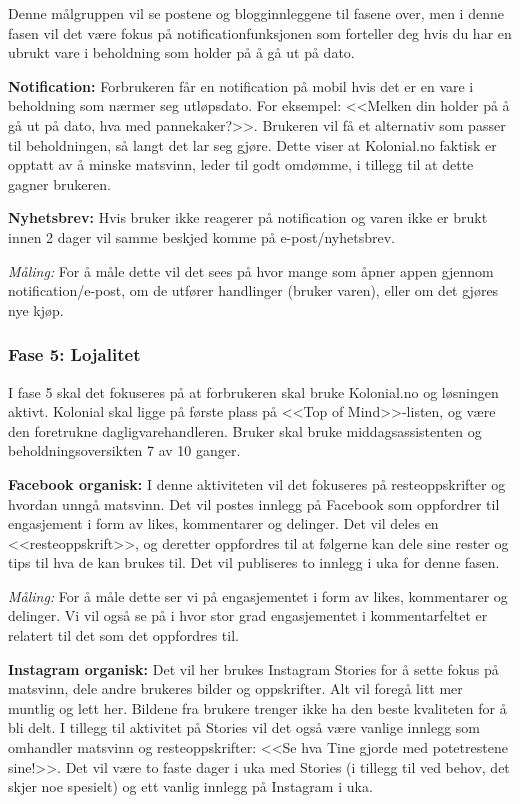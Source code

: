 Denne målgruppen vil se postene og blogginnleggene til fasene over, men i denne fasen vil det være fokus på notificationfunksjonen som forteller deg hvis du har en ubrukt vare i beholdning som holder på å gå ut på dato. 

\textbf{Notification:} Forbrukeren får en notification på mobil hvis det er en vare i beholdning som nærmer seg utløpsdato. For eksempel: <<Melken din holder på å gå ut på dato, hva med pannekaker?>>. Brukeren vil få et alternativ som passer til beholdningen, så langt det lar seg gjøre. Dette viser at Kolonial.no faktisk er opptatt av å minske matsvinn, leder til godt omdømme, i tillegg til at dette gagner brukeren. 

\textbf{Nyhetsbrev:} Hvis bruker ikke reagerer på notification og varen ikke er brukt innen 2 dager vil samme beskjed komme på e-post/nyhetsbrev. 

\textit{Måling:} For å måle dette vil det sees på hvor mange som åpner appen gjennom notification/e-post, om de utfører handlinger (bruker varen), eller om det gjøres nye kjøp. 

\subsubsection{\textbf{Fase 5: Lojalitet}}
I fase 5 skal det fokuseres på at forbrukeren skal bruke Kolonial.no og løsningen aktivt. Kolonial skal ligge på første plass på <<Top of Mind>>-listen, og være den foretrukne dagligvarehandleren. Bruker skal bruke middagsassistenten og beholdningsoversikten 7 av 10 ganger. 

\textbf{Facebook organisk:} I denne aktiviteten vil det fokuseres på resteoppskrifter og hvordan unngå matsvinn. Det vil postes innlegg på Facebook som oppfordrer til engasjement i form av likes, kommentarer og delinger. Det vil deles en <<resteoppskrift>>, og deretter oppfordres til at følgerne kan dele sine rester og tips til hva de kan brukes til. Det vil publiseres to innlegg i uka for denne fasen. 

\textit{Måling:} For å måle dette ser vi på engasjementet i form av likes, kommentarer og delinger. Vi vil også se på i hvor stor grad engasjementet i kommentarfeltet er relatert til det som det oppfordres til.

\textbf{Instagram organisk:} Det vil her brukes Instagram Stories for å sette fokus på matsvinn, dele andre brukeres bilder og oppskrifter. Alt vil foregå litt mer muntlig og lett her. Bildene fra brukere trenger ikke ha den beste kvaliteten for å bli delt. I tillegg til aktivitet på Stories vil det også være vanlige innlegg som omhandler matsvinn og resteoppskrifter: <<Se hva Tine gjorde med potetrestene sine!>>. Det vil være to faste dager i uka med Stories (i tillegg til ved behov, det skjer noe spesielt) og ett vanlig innlegg på Instagram i uka. 

